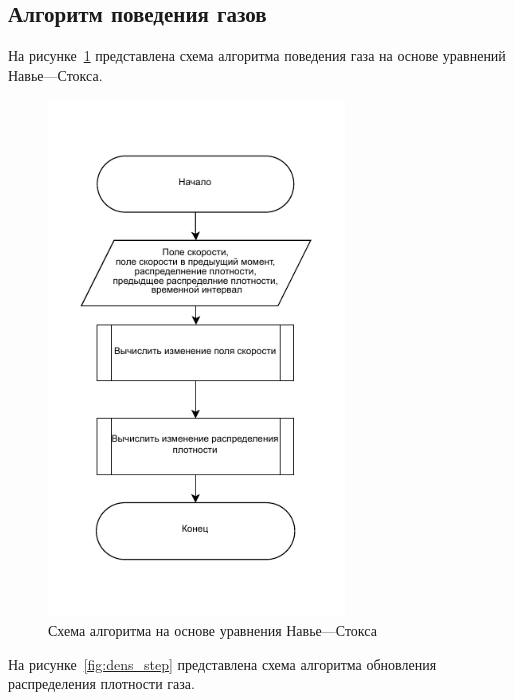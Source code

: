 \subsection{Алгоритм поведения газов}

На рисунке~\ref{fig:Navie-Stocks} представлена схема алгоритма поведения газа на основе уравнений Навье---Стокса. 
\begin{figure}[H]
	\centering
	\includegraphics[width=0.7\textwidth, page=1]{assets/img/Naive_stocks.pdf}   
	\caption{Схема алгоритма на основе уравнения Навье---Стокса}
	\label{fig:Navie-Stocks}
\end{figure}

На рисунке~\ref{fig:dens_step} представлена схема алгоритма обновления распределения плотности газа.


